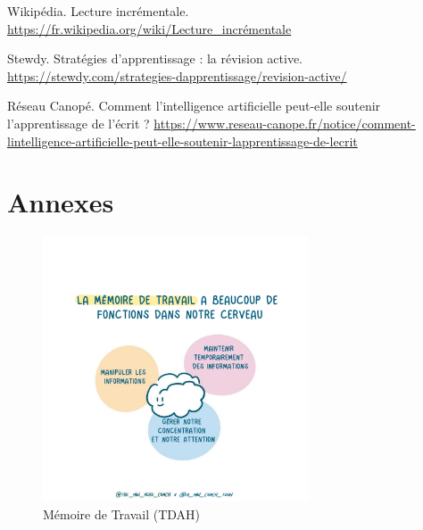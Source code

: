 \documentclass[12pt,a4paper]{report}
\begin{document}
\begin{thebibliography}{9}
        Wikipédia. Lecture incrémentale. \break
    \url{https://fr.wikipedia.org/wiki/Lecture_incrémentale}

        Stewdy. Stratégies d'apprentissage : la révision active. \break
    \url{https://stewdy.com/strategies-dapprentissage/revision-active/}

        Réseau Canopé. Comment l'intelligence artificielle peut-elle soutenir l'apprentissage de l'écrit ? \break
    \url{https://www.reseau-canope.fr/notice/comment-lintelligence-artificielle-peut-elle-soutenir-lapprentissage-de-lecrit}
    
\end{thebibliography}

\chapter*{Annexes}

\begin{figure}[h]
    \centering
    \includegraphics[width=0.7\textwidth]{images/ADHD-Working-Memory.png}
    \caption{Mémoire de Travail (TDAH)}
    \label{fig:tdah}
\end{figure}
\end{document}
